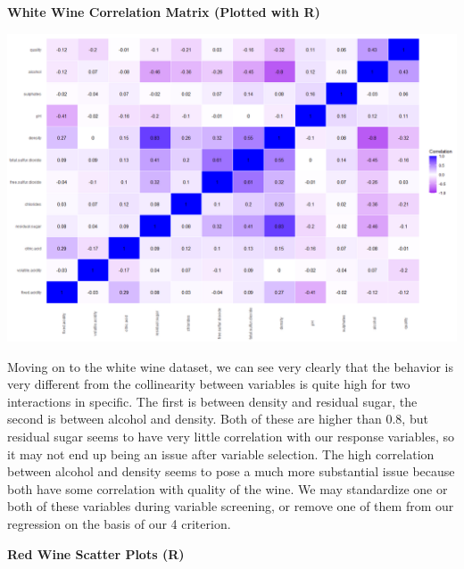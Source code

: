\documentclass{article}
\begin{document}
	\newpage
	\textbf{ White Wine Correlation Matrix (Plotted with R)}
	
	\includegraphics[scale=0.5]{../plots/Wine/white_wine_Rcormat.png}

	
	Moving on to the white wine dataset, we can see very clearly that the behavior is very different from the collinearity 
	between variables is quite high for two interactions in specific. The first is between density and residual sugar, the 
	second is between alcohol and density. Both of these are higher than 0.8, but residual sugar seems to have very little 
	correlation with our response variables, so it may not end up being an issue after variable selection. The high 
	correlation between alcohol and density seems to pose a much more substantial issue because both have some 
	correlation with quality of the wine. We may standardize one or both of these variables during variable 
	screening, or remove one of them from our regression on the basis of our 4 criterion. 
	
	\newpage 
	
	\textbf{Red Wine Scatter Plots (R)}
	
\end{document}
